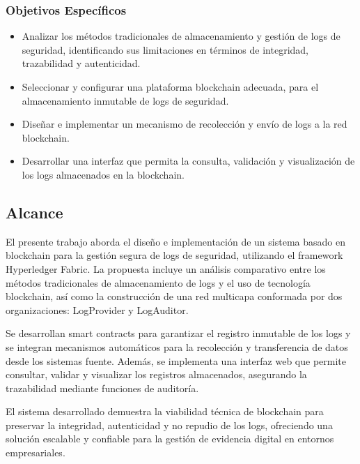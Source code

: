 \subsubsection{Objetivos Específicos}
\begin{itemize}
    \item Analizar los métodos tradicionales de almacenamiento y gestión de logs de seguridad, identificando sus limitaciones en términos de integridad, trazabilidad y autenticidad.
    \item Seleccionar y configurar una plataforma blockchain adecuada, para el almacenamiento inmutable de logs de seguridad.
    \item Diseñar e implementar un mecanismo de recolección y envío de logs a la red blockchain.
    \item  Desarrollar una interfaz que permita la consulta, validación y visualización de los logs almacenados en la blockchain.


 
\end{itemize}

 


\subsection{Alcance}
El presente trabajo aborda el diseño e implementación de un sistema basado en blockchain para la gestión segura de logs de seguridad, utilizando el framework Hyperledger Fabric. La propuesta incluye un análisis comparativo entre los métodos tradicionales de almacenamiento de logs y el uso de tecnología blockchain, así como la construcción de una red multicapa conformada por dos organizaciones: LogProvider y LogAuditor.

Se desarrollan smart contracts para garantizar el registro inmutable de los logs y se integran mecanismos automáticos para la recolección y transferencia de datos desde los sistemas fuente. Además, se implementa una interfaz web que permite consultar, validar y visualizar los registros almacenados, asegurando la trazabilidad mediante funciones de auditoría.

El sistema desarrollado demuestra la viabilidad técnica de blockchain para preservar la integridad, autenticidad y no repudio de los logs, ofreciendo una solución escalable y confiable para la gestión de evidencia digital en entornos empresariales.

